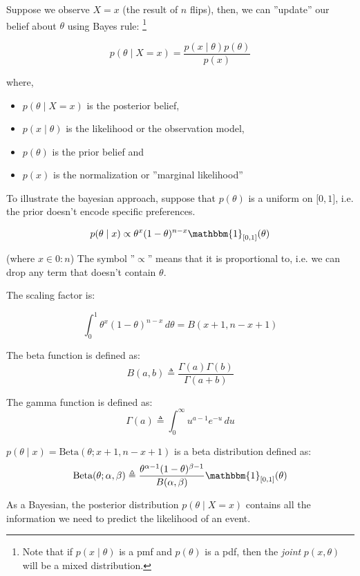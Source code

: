 \documentclass[12pt]{report}
\newcommand{\defobj}[1]{\color{red}#1\color{black}{}}
\newcommand{\defmean}[1]{\color{green!70!black}#1\color{black}{}}
\renewcommand{\emph}[1]{\color{violet}#1\color{black}{}}
\begin{document}
Suppose we observe $ X = x $ (the result of $ n $ flips), then, we can ''update'' our belief about $ \theta $ using Bayes rule: \footnote{Note that if $ p(x \mid \theta) $ is a pmf and $ p(\theta) $ is a pdf, then the {\it joint} $ p(x , \theta) $ will be a mixed distribution. }

$$ p(\theta \mid X = x) = \frac{p(x \mid \theta) p(\theta)}{p(x)} $$

where,
\begin{itemize}
    \item[] $ p(\theta \mid X = x) $ is the \emph{posterior belief}, 
    \item[] $ p(x \mid \theta) $ is the \emph{likelihood} or the observation model, 
    \item[] $ p(\theta) $ is the \emph{prior belief} and 
    \item[] $ p(x) $ is the \emph{normalization} or ''marginal likelihood''
\end{itemize}



To illustrate the bayesian approach, suppose that $ p( \theta ) $ is a uniform on $ \lbrack 0,1 \rbrack $, i.e. the prior doesn't encode specific preferences.

$$ p(\theta \mid x) \propto \theta^{x} (1 - \theta)^{n - x} \mathbbm{1}_{\lbrack 0, 1 \rbrack}( \theta )$$

(where $ x \in 0:n $) The symbol ''$ \propto $'' means that it is proportional to, i.e. we can drop any term that doesn't contain $ \theta $.

The scaling factor is:

$$ \int_{0}^{1} \theta^x (1 - \theta)^{n - x} \,d\theta = B(x + 1, n - x + 1) $$

The \defobj{beta function} is defined as:
\defmean{ $$ B(a, b) \triangleq \frac{\Gamma(a)\Gamma(b)}{\Gamma(a + b)} $$ }

The \defobj{gamma function} is defined as:
\defmean{ $$ \Gamma (a) \triangleq \int_{0}^{\infty} u^{a - 1} e^{-u} \,du $$ }

$ p(\theta \mid x) = \text{Beta}(\theta ; x + 1, n - x + 1)$ is a \defobj{beta distribution} defined as:
\defmean{ $$ \text{Beta}(\theta; \alpha, \beta) \triangleq \frac{\theta^{\alpha - 1}(1 - \theta)^{\beta - 1}}{B(\alpha, \beta)} \mathbbm{1}_{\lbrack 0,1 \rbrack}(\theta)$$ }

As a Bayesian, the posterior distribution $ p(\theta \mid X = x) $ contains all the information we need to predict the likelihood of an event.
\end{document}
